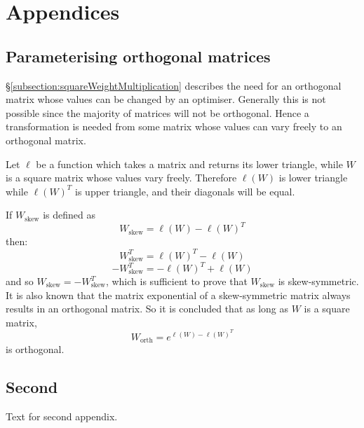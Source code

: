 \documentclass[../main.tex]{subfiles}
\begin{document}
\chapter*{Appendices} \label{chapter:appendices}

\renewcommand{\thesection}{\Alph{section}}
\setcounter{section}{0}
\renewcommand*{\theHsection}{chX.\the\value{section}}

\section{Parameterising orthogonal matrices} \label{appendix:parameterisingOrthogonalMatrices}

\S\ref{subsection:squareWeightMultiplication} describes the need for an orthogonal matrix whose values can be changed by an optimiser.
Generally this is not possible since the majority of matrices will not be orthogonal.
Hence a transformation is needed from some matrix whose values can vary freely to an orthogonal matrix.

Let $\ell$ be a function which takes a matrix and returns its lower triangle, while $W$ is a square matrix whose values vary freely.
Therefore $\ell(W)$ is lower triangle while $\ell(W)^T$ is upper triangle, and their diagonals will be equal.

If $W_\text{skew}$ is defined as
\begin{equation}
    W_\text{skew}=\ell(W)-\ell(W)^T
\end{equation}
then:
\begin{equation}
    W_\text{skew}^T=\ell(W)^T-\ell(W)
\end{equation}
\begin{equation}
    -W_\text{skew}^T=-\ell(W)^T+\ell(W)
\end{equation}
and so $W_\text{skew}=-W_\text{skew}^T$, which is sufficient to prove that $W_\text{skew}$ is skew-symmetric.
It is also known that the matrix exponential of a skew-symmetric matrix always results in an orthogonal matrix.
So it is concluded that as long as $W$ is a square matrix,
\begin{equation}
    W_\text{orth}=e^{\ell(W)-\ell(W)^T}
\end{equation}
is orthogonal.

\section{Second} \label{appendix:second}

Text for second appendix.
\end{document}
